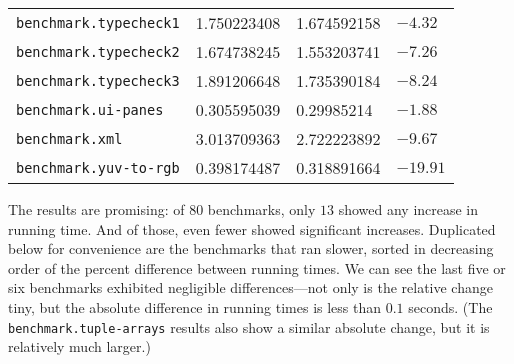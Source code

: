 \begin{longtable}{llll}
\texttt{benchmark.typecheck1}               & 1.750223408       & 1.674592158         & $-4.32$     \\
\texttt{benchmark.typecheck2}               & 1.674738245       & 1.553203741         & $-7.26$     \\
\texttt{benchmark.typecheck3}               & 1.891206648       & 1.735390184         & $-8.24$     \\
\texttt{benchmark.ui-panes}                 & 0.305595039       & 0.29985214          & $-1.88$     \\
\texttt{benchmark.xml}                      & 3.013709363       & 2.722223892         & $-9.67$     \\
\texttt{benchmark.yuv-to-rgb}               & 0.398174487       & 0.318891664         & $-19.91$    \\
\end{longtable}

The results are promising: of $80$ benchmarks, only $13$ showed any increase in
running time.  And of those, even fewer showed significant increases.
Duplicated below for convenience are the benchmarks that ran slower, sorted in
decreasing order of the percent difference between running times.  We can see
the last five or six benchmarks exhibited negligible differences---not only is
the relative change tiny, but the absolute difference in running times is less
than $0.1$ seconds.  (The \Verb|benchmark.tuple-arrays| results also show a
similar absolute change, but it is relatively much larger.)

